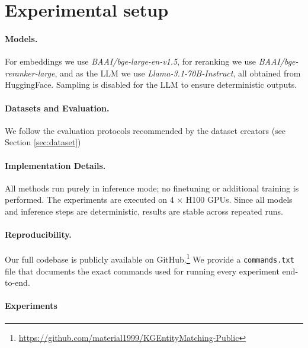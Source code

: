 \documentclass[11pt]{article}
\begin{document}
\section{Experimental setup}

\paragraph{Models.} 
For embeddings we use \emph{BAAI/bge-large-en-v1.5}, for reranking we use \emph{BAAI/bge-reranker-large}, 
and as the LLM we use \emph{Llama-3.1-70B-Instruct}, all obtained from HuggingFace. 
Sampling is disabled for the LLM to ensure deterministic outputs. 

\paragraph{Datasets and Evaluation.} 
We follow the evaluation protocols recommended by the dataset creators (see Section \ref{sec:dataset})

\paragraph{Implementation Details.} 
All methods run purely in inference mode; no finetuning or additional training is performed.
The experiments are executed on 4 × H100 GPUs. 
Since all models and inference steps are deterministic, results are stable across repeated runs. 

\paragraph{Reproducibility.} 
Our full codebase is publicly available on GitHub.\footnote{\url{https://github.com/material1999/KGEntityMatching-Public}} 
We provide a \texttt{commands.txt} file that documents the exact commands used for running every experiment end-to-end.

\paragraph{Experiments}
\end{document}
